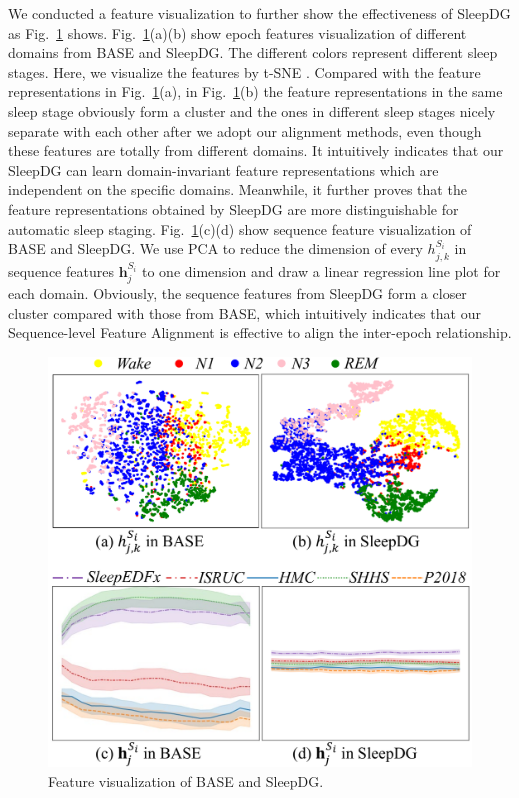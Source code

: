\documentclass[letterpaper]{article} %
\begin{document}
	We conducted a feature visualization to further show the effectiveness of SleepDG as Fig.~\ref{fig:Case} shows.
	Fig.~\ref{fig:Case}(a)(b) show epoch features visualization of different domains from BASE and SleepDG. The different colors represent different sleep stages.
	Here, we visualize the features by t-SNE \citep{van2008visualizing}.
	Compared with the feature representations in Fig.~\ref{fig:Case}(a), in Fig.~\ref{fig:Case}(b) the feature representations in the same sleep stage obviously form a cluster and the ones in different sleep stages nicely separate with each other after we adopt our alignment methods, even though these features are totally from different domains. It intuitively indicates that our SleepDG can learn domain-invariant feature representations which are independent on the specific domains.
	Meanwhile, it further proves that the feature representations obtained by SleepDG are more distinguishable for automatic sleep staging.
	Fig.~\ref{fig:Case}(c)(d) show sequence feature visualization of BASE and SleepDG.
	We use PCA to reduce the dimension of every $h^{S_i}_{j, k}$ in sequence features $\mathrm{\mathbf{h}}^{S_i}_j$ to one dimension and draw a linear regression line plot for each domain.
	Obviously, the sequence features from SleepDG form a closer cluster compared with those from BASE, which intuitively indicates that our Sequence-level Feature Alignment is effective to align the inter-epoch relationship.

\begin{figure}[tb]
	\centering
	\small
	\includegraphics[width=0.98\columnwidth]{case}
	\caption{Feature visualization of BASE and SleepDG.}
	\label{fig:Case}
\end{figure}
\end{document}

